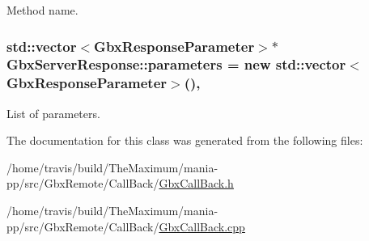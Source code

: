 Method name. 

\hypertarget{classGbxServerResponse_ad6fef5319c4da9461f4cd0d72d8b5ee8}{
\subsubsection[{parameters}]{\setlength{\rightskip}{0pt plus 5cm}std\-::vector$<${\bf Gbx\-Response\-Parameter}$>$$\ast$ Gbx\-Server\-Response\-::parameters = new std\-::vector$<${\bf Gbx\-Response\-Parameter}$>$()\hspace{0.3cm}{\ttfamily [protected]}, {\ttfamily [inherited]}}}\label{classGbxServerResponse_ad6fef5319c4da9461f4cd0d72d8b5ee8}


List of parameters. 



The documentation for this class was generated from the following files\-:\begin{DoxyCompactItemize}
\item 
/home/travis/build/\-The\-Maximum/mania-\/pp/src/\-Gbx\-Remote/\-Call\-Back/\hyperlink{GbxCallBack_8h}{Gbx\-Call\-Back.\-h}\item 
/home/travis/build/\-The\-Maximum/mania-\/pp/src/\-Gbx\-Remote/\-Call\-Back/\hyperlink{GbxCallBack_8cpp}{Gbx\-Call\-Back.\-cpp}\end{DoxyCompactItemize}
